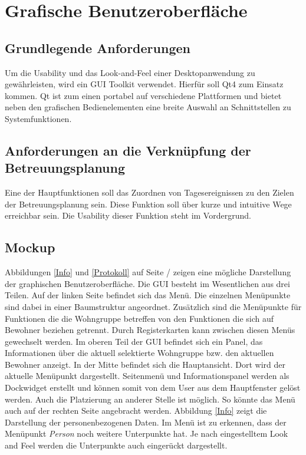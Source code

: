 \documentclass[a4paper,10pt]{article}
\begin{document}
\section{Grafische Benutzeroberfläche}
\subsection{Grundlegende Anforderungen}
Um die Usability und das Look-and-Feel einer Desktopanwendung zu gewährleisten, wird ein GUI Toolkit verwendet.
Hierfür soll Qt4 zum Einsatz kommen. Qt ist zum einen portabel auf verschiedene Plattformen 
und bietet neben den grafischen Bedienelementen eine breite Auswahl an Schnittstellen zu Systemfunktionen.
\subsection{Anforderungen an die Verknüpfung der Betreuungsplanung}
Eine der Hauptfunktionen soll das Zuordnen von Tagesereignissen zu den Zielen der Betreuungsplanung sein. Diese Funktion soll über 
kurze und intuitive Wege erreichbar sein. Die Usability dieser Funktion steht im Vordergrund.
\subsection{Mockup}
Abbildungen \ref{Info} und \ref{Protokoll} auf Seite \pageref{Info} / \pageref{Protokoll}  zeigen eine mögliche Darstellung der graphischen Benutzeroberfläche. 
Die GUI besteht im Wesentlichen aus drei Teilen. Auf der linken Seite befindet sich das Menü. Die einzelnen Menüpunkte sind dabei in einer Baumstruktur angeordnet. 
Zusätzlich sind die Menüpunkte für Funktionen die die Wohngruppe betreffen von den Funktionen die sich auf Bewohner beziehen getrennt. 
Durch Registerkarten kann zwischen diesen Menüs gewechselt werden. Im oberen Teil der GUI befindet sich ein Panel, das Informationen über die aktuell selektierte Wohngruppe bzw. den aktuellen Bewohner anzeigt. 
In der Mitte befindet sich die Hauptansicht. Dort wird der aktuelle Menüpunkt dargestellt. Seitenmenü und Informationspanel werden als Dockwidget erstellt und können 
somit von dem User aus dem Hauptfenster gelöst werden. Auch die Platzierung an anderer Stelle ist möglich. So könnte das Menü auch auf der rechten Seite angebracht werden.
\newline
Abbildung \ref{Info} zeigt die Darstellung der personenbezogenen Daten. Im Menü ist zu erkennen, dass der Menüpunkt \emph{Person} noch weitere Unterpunkte hat. 
Je nach eingestelltem Look and Feel werden die Unterpunkte auch eingerückt dargestellt.
\end{document}
